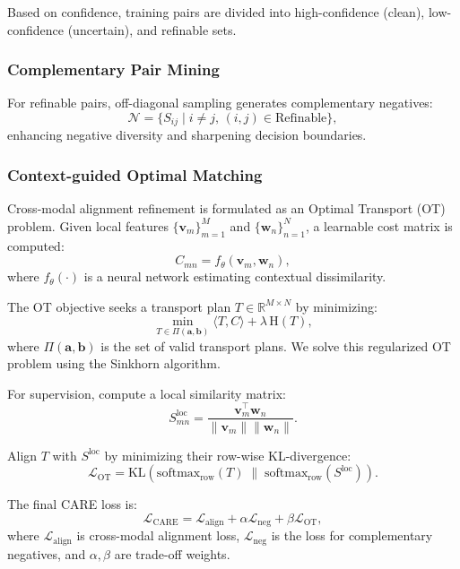 \documentclass{article}
\begin{document}
Based on confidence, training pairs are divided into high-confidence (clean), low-confidence (uncertain), and refinable sets.

\subsubsection{Complementary Pair Mining}
For refinable pairs, off-diagonal sampling generates complementary negatives:
\begin{equation}
    \mathcal{N} = \{ S_{ij} \mid i \neq j, \, (i,j) \in \text{Refinable} \},
\end{equation}
enhancing negative diversity and sharpening decision boundaries.

\subsubsection{Context-guided Optimal Matching}
Cross-modal alignment refinement is formulated as an Optimal Transport (OT) problem.
Given local features $\{\mathbf{v}_m\}_{m=1}^M$ and $\{\mathbf{w}_n\}_{n=1}^N$, a learnable cost matrix is computed:
\begin{equation}
    C_{mn} = f_\theta(\mathbf{v}_m, \mathbf{w}_n),
\end{equation}
where $f_\theta(\cdot)$ is a neural network estimating contextual dissimilarity.

The OT objective seeks a transport plan $T \in \mathbb{R}^{M \times N}$ by minimizing:
\begin{equation}
    \min_{T \in \Pi(\mathbf{a}, \mathbf{b})} \langle T, C \rangle + \lambda \, \mathrm{H}(T),
\end{equation}
where $\Pi(\mathbf{a},\mathbf{b})$ is the set of valid transport plans. We solve this regularized OT problem using the Sinkhorn algorithm.

For supervision, compute a local similarity matrix:
\begin{equation}
    S^{\mathrm{loc}}_{mn} = \frac{\mathbf{v}_m^\top \mathbf{w}_n}{\|\mathbf{v}_m\|\|\mathbf{w}_n\|}.
\end{equation}

Align $T$ with $S^{\mathrm{loc}}$ by minimizing their row-wise KL-divergence:
\begin{equation}
    \mathcal{L}_{\mathrm{OT}} = \mathrm{KL}(\mathrm{softmax}_{\mathrm{row}}(T) \; \| \; \mathrm{softmax}_{\mathrm{row}}(S^{\mathrm{loc}})).
\end{equation}

The final CARE loss is:
\begin{equation}\label{eq:care_loss}
    \mathcal{L}_{\mathrm{CARE}} = \mathcal{L}_{\mathrm{align}} + \alpha \mathcal{L}_{\mathrm{neg}} + \beta \mathcal{L}_{\mathrm{OT}},
\end{equation}
where $\mathcal{L}_{\mathrm{align}}$ is cross-modal alignment loss, $\mathcal{L}_{\mathrm{neg}}$ is the loss for complementary negatives, and $\alpha, \beta$ are trade-off weights.
\end{document}
